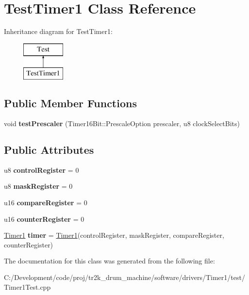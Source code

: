 \hypertarget{class_test_timer1}{}\section{Test\+Timer1 Class Reference}
\label{class_test_timer1}
Inheritance diagram for Test\+Timer1\+:\begin{figure}[H]
\begin{center}
\leavevmode
\includegraphics[height=2.000000cm]{class_test_timer1}
\end{center}
\end{figure}
\subsection*{Public Member Functions}
\begin{DoxyCompactItemize}
\item 
\mbox{\label{class_test_timer1_a4d7cf69c616454c22965c8ab4c66f2db}} 
void {\bfseries test\+Prescaler} (Timer16\+Bit\+::\+Prescale\+Option prescaler, u8 clock\+Select\+Bits)
\end{DoxyCompactItemize}
\subsection*{Public Attributes}
\begin{DoxyCompactItemize}
\item 
\mbox{\label{class_test_timer1_add5d5b6530c9413c76006ecf1298a557}} 
u8 {\bfseries control\+Register} = 0
\item 
\mbox{\label{class_test_timer1_a558b30afc156a6b059dec60b0865afff}} 
u8 {\bfseries mask\+Register} = 0
\item 
\mbox{\label{class_test_timer1_a8dfc65d3d55a990516eedf2b53b45c4a}} 
u16 {\bfseries compare\+Register} = 0
\item 
\mbox{\label{class_test_timer1_a73a86e57155af36771df5355b2caea13}} 
u16 {\bfseries counter\+Register} = 0
\item 
\mbox{\label{class_test_timer1_ae95c4709c5e8061b5fe4a4c16e46860e}} 
\mbox{\hyperlink{class_timer1}{Timer1}} {\bfseries timer} = \mbox{\hyperlink{class_timer1}{Timer1}}(control\+Register, mask\+Register, compare\+Register, counter\+Register)
\end{DoxyCompactItemize}


The documentation for this class was generated from the following file\+:\begin{DoxyCompactItemize}
\item 
C\+:/\+Development/code/proj/tr2k\+\_\+drum\+\_\+machine/software/drivers/\+Timer1/test/Timer1\+Test.\+cpp\end{DoxyCompactItemize}
